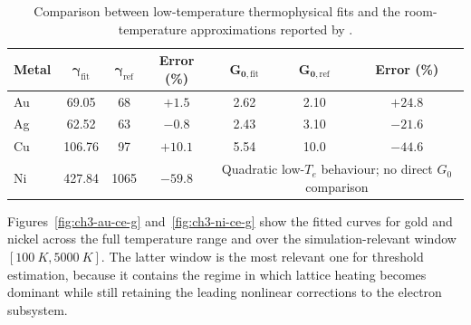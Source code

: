 \begin{table}[htbp]
    \centering
    \caption{Comparison between low-temperature thermophysical fits and the room-temperature approximations reported by \cite{Chen_2010}.}
    \label{tab:ch3-fitting-errors}
    \begin{tabular}{@{}lcccccc@{}}
        \toprule
        \rowcolor{gray!20}
        \textbf{Metal} & \(\boldsymbol{\gamma_{\mathrm{fit}}}\) & \(\boldsymbol{\gamma_{\mathrm{ref}}}\) & \textbf{Error (\%)} & \(\boldsymbol{G_{0,\mathrm{fit}}}\)                                               & \(\boldsymbol{G_{0,\mathrm{ref}}}\) & \textbf{Error (\%)} \\
        \midrule
        Au             & 69.05                                  & 68                                     & \(+1.5\)            & 2.62                                                                              & 2.10                                & \(+24.8\)           \\
        Ag             & 62.52                                  & 63                                     & \(-0.8\)            & 2.43                                                                              & 3.10                                & \(-21.6\)           \\
        Cu             & 106.76                                 & 97                                     & \(+10.1\)           & 5.54                                                                              & 10.0                                & \(-44.6\)           \\
        Ni             & 427.84                                 & 1065                                   & \(-59.8\)           & \multicolumn{3}{c}{Quadratic low-\(T_e\) behaviour; no direct \(G_0\) comparison}                                                             \\
        \bottomrule
    \end{tabular}
\end{table}

Figures~\ref{fig:ch3-au-ce-g} and~\ref{fig:ch3-ni-ce-g} show the fitted
curves for gold and nickel across the full temperature range and over the
simulation-relevant window \([\SI{100}{K}, \SI{5000}{K}]\). The latter
window is the most relevant one for threshold estimation, because it
contains the regime in which lattice heating becomes dominant while still
retaining the leading nonlinear corrections to the electron subsystem.

